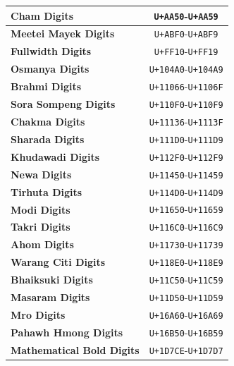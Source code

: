 \documentclass [10pt]{article}
\begin{document}
\begin{center}
\begin{longtable}{|l|c|}
  	\textbf{Cham Digits}                         &  \texttt{U+AA50}-\texttt{U+AA59}  \\ \hline
  	\textbf{Meetei Mayek Digits}                 &  \texttt{U+ABF0}-\texttt{U+ABF9}  \\ \hline
  	\textbf{Fullwidth Digits}                    &  \texttt{U+FF10}-\texttt{U+FF19}  \\ \hline
  	\textbf{Osmanya Digits}                      & \texttt{U+104A0}-\texttt{U+104A9} \\ \hline
  	\textbf{Brahmi Digits}                       & \texttt{U+11066}-\texttt{U+1106F} \\ \hline
  	\textbf{Sora Sompeng Digits}                 & \texttt{U+110F0}-\texttt{U+110F9} \\ \hline
  	\textbf{Chakma Digits}                       & \texttt{U+11136}-\texttt{U+1113F} \\ \hline
  	\textbf{Sharada Digits}                      & \texttt{U+111D0}-\texttt{U+111D9} \\ \hline
  	\textbf{Khudawadi Digits}                    & \texttt{U+112F0}-\texttt{U+112F9} \\ \hline
  	\textbf{Newa Digits}                         & \texttt{U+11450}-\texttt{U+11459} \\ \hline
  	\textbf{Tirhuta Digits}                      & \texttt{U+114D0}-\texttt{U+114D9} \\ \hline
  	\textbf{Modi Digits}                         & \texttt{U+11650}-\texttt{U+11659} \\ \hline
  	\textbf{Takri Digits}                        & \texttt{U+116C0}-\texttt{U+116C9} \\ \hline
  	\textbf{Ahom Digits}                         & \texttt{U+11730}-\texttt{U+11739} \\ \hline
  	\textbf{Warang Citi Digits}                  & \texttt{U+118E0}-\texttt{U+118E9} \\ \hline
  	\textbf{Bhaiksuki Digits}                    & \texttt{U+11C50}-\texttt{U+11C59} \\ \hline
  	\textbf{Masaram Digits}                      & \texttt{U+11D50}-\texttt{U+11D59} \\ \hline
  	\textbf{Mro Digits}                          & \texttt{U+16A60}-\texttt{U+16A69} \\ \hline
  	\textbf{Pahawh Hmong Digits}                 & \texttt{U+16B50}-\texttt{U+16B59} \\ \hline
  	\textbf{Mathematical Bold Digits}            & \texttt{U+1D7CE}-\texttt{U+1D7D7} \\ \hline

\end{longtable}
\end{center}
\end{document}
